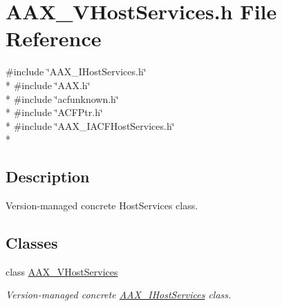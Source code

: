 \hypertarget{a00311}{}\section{A\+A\+X\+\_\+\+V\+Host\+Services.\+h File Reference}
\label{a00311}
{\ttfamily \#include \char`\"{}A\+A\+X\+\_\+\+I\+Host\+Services.\+h\char`\"{}}\\*
{\ttfamily \#include \char`\"{}A\+A\+X.\+h\char`\"{}}\\*
{\ttfamily \#include \char`\"{}acfunknown.\+h\char`\"{}}\\*
{\ttfamily \#include \char`\"{}A\+C\+F\+Ptr.\+h\char`\"{}}\\*
{\ttfamily \#include \char`\"{}A\+A\+X\+\_\+\+I\+A\+C\+F\+Host\+Services.\+h\char`\"{}}\\*


\subsection{Description}
Version-\/managed concrete Host\+Services class. 

\subsection*{Classes}
\begin{DoxyCompactItemize}
\item 
class \hyperlink{a00137}{A\+A\+X\+\_\+\+V\+Host\+Services}
\begin{DoxyCompactList}\small\item\em Version-\/managed concrete \hyperlink{a00103}{A\+A\+X\+\_\+\+I\+Host\+Services} class. \end{DoxyCompactList}\end{DoxyCompactItemize}
